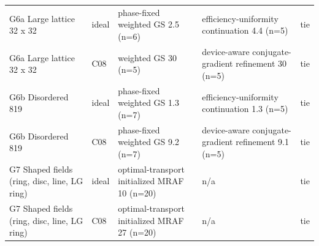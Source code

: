 \begin{table}[t]
\begin{tabular}{@{}>{\raggedright\arraybackslash}p{} l >{\raggedright\arraybackslash}p{} >{\raggedright\arraybackslash}p{} l@{}}
G6a Large lattice 32 x 32 & ideal & phase-fixed weighted GS 2.5 (n=6) & efficiency-uniformity continuation 4.4 (n=5) & tie\\
G6a Large lattice 32 x 32 & C08 & weighted GS 30 (n=5) & device-aware conjugate-gradient refinement 30 (n=5) & tie\\
G6b Disordered 819 & ideal & phase-fixed weighted GS 1.3 (n=7) & efficiency-uniformity continuation 1.3 (n=5) & tie\\
G6b Disordered 819 & C08 & phase-fixed weighted GS 9.2 (n=7) & device-aware conjugate-gradient refinement 9.1 (n=5) & tie\\
G7 Shaped fields (ring, disc, line, LG ring) & ideal & optimal-transport initialized MRAF 10 (n=20) & n/a & tie\\
G7 Shaped fields (ring, disc, line, LG ring) & C08 & optimal-transport initialized MRAF 27 (n=20) & n/a & tie\\
\bottomrule\end{tabular}\end{table}
